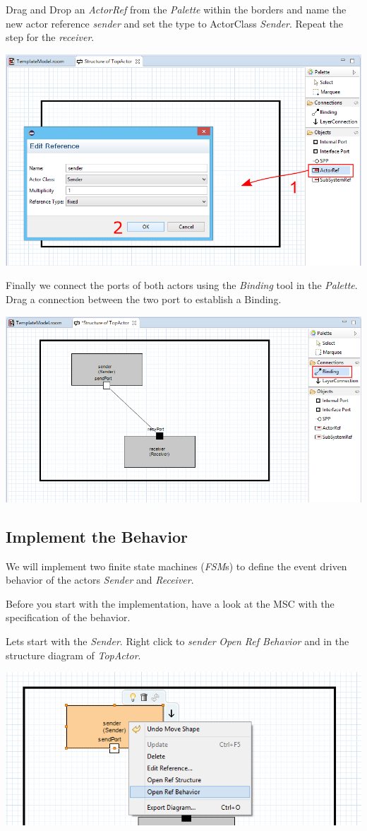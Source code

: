 Drag and Drop an \emph{ActorRef} from the \emph{Palette} within the borders and name the new actor reference \emph{sender} and set the type to ActorClass \emph{Sender}. Repeat the step for the \emph{receiver}. 

\includegraphics[width=.8\textwidth]{images/015-add-sender.png}

Finally we connect the ports of both actors using the \emph{Binding} tool in the \emph{Palette}. Drag a connection between the two port to establish a Binding.

\includegraphics[width=.8\textwidth]{images/015-add-binding.png}

\subsection{Implement the Behavior}

We will implement two finite state machines (\emph{FSM}s) to define the event driven behavior of the actors  \emph{Sender} and \emph{Receiver}.

Before you start with the implementation, have a look at the MSC with the specification of the behavior.

Lets start with the \emph{Sender}. Right click to \emph{sender} \emph{Open Ref Behavior} and in the structure diagram of \emph{TopActor}.

\includegraphics[width=.6\textwidth]{images/015-open-behavior-sender.png}

